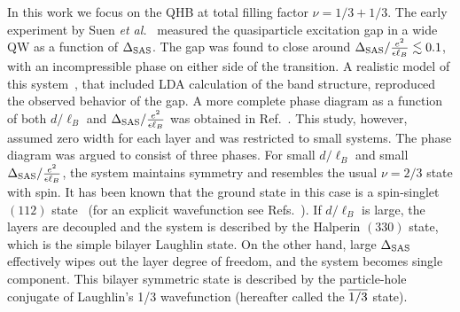 In this work we focus on the QHB at total filling factor $\nu=1/3+1/3$.
The early experiment by Suen \emph{et al.}~\cite{Suen94} measured the quasiparticle excitation gap in a wide QW as a function of $\Delta_\textrm{SAS}$.
The gap was found to close around $\Delta_\textrm{SAS}/\frac{e^2}{\epsilon\ell_B} \lesssim 0.1$, with an incompressible phase on either side of the transition.
A realistic model of this system~\cite{Lay97}, that included LDA calculation of the band structure, reproduced the observed behavior of the gap. 
A more complete phase diagram as a function of both $d/\ell_B$ and $\Delta_\textrm{SAS}/\frac{e^2}{\epsilon\ell_B}$ was obtained in Ref.~\cite{HaldaneDiagram}.
This study, however, assumed zero width for each layer and was restricted to small systems.
The phase diagram was argued to consist of three phases.
For small $d/\ell_B$ and small $\Delta_\textrm{SAS}/\frac{e^2}{\epsilon\ell_B}$, the system maintains  symmetry and resembles the usual $\nu=2/3$ state with spin.
It has been known that the ground state in this case is a spin-singlet $(112)$ state~\cite{Chakraborty84, Rezayi87, Maksym89, Wu93} (for an explicit wavefunction see Refs.~\cite{HaldaneDiagram,Moore97}). 
If $d/\ell_B$ is large, the layers are decoupled and the system is described by the Halperin $(330)$ state, which is the simple bilayer Laughlin state.
On the other hand, large $\Delta_\textrm{SAS}$ effectively wipes out the layer degree of freedom, and the system becomes single component.
This bilayer symmetric state is described by the particle-hole conjugate of Laughlin's 1/3 wavefunction (hereafter called the $\overline{1/3}$ state).         

